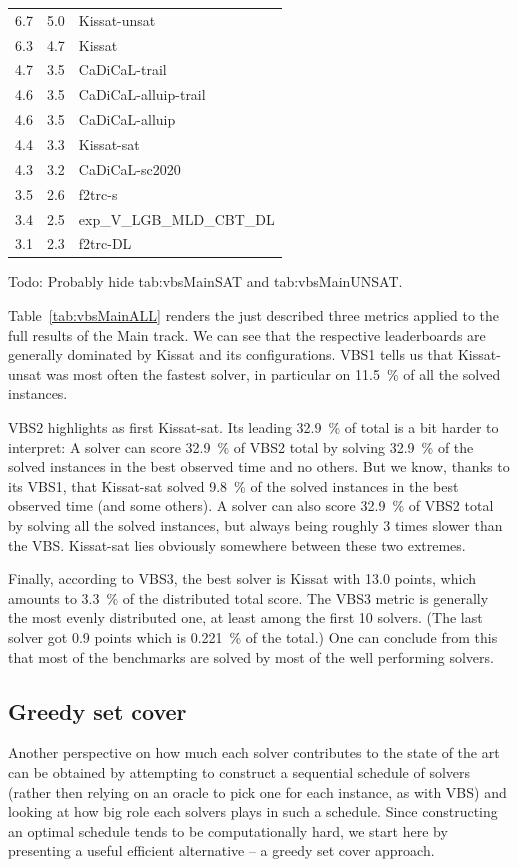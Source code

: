 \documentclass{elsarticle}
\newcommand{\todo}[1]{{\color{purple}Todo: #1}}
\begin{document}
\begin{table}
\begin{center}
\begin{tabular}{ccl}
\hline
6.7 & 5.0 & Kissat-unsat \\
6.3 & 4.7 & Kissat \\
4.7 & 3.5 & CaDiCaL-trail \\
4.6 & 3.5 & CaDiCaL-alluip-trail \\
4.6 & 3.5 & CaDiCaL-alluip \\
4.4 & 3.3 & Kissat-sat \\
4.3 & 3.2 & CaDiCaL-sc2020 \\
3.5 & 2.6 & f2trc-s \\
3.4 & 2.5 & exp\_V\_LGB\_MLD\_CBT\_DL \\
3.1 & 2.3 & f2trc-DL \\
\end{tabular}
\end{center}
\end{table}

\todo{Probably hide tab:vbsMainSAT and tab:vbsMainUNSAT.} 

Table~\ref{tab:vbsMainALL} renders the just described three metrics applied 
to the full results of the Main track. We can see that the respective leaderboards 
are generally dominated by Kissat and its configurations.
VBS1 tells us that Kissat-unsat was most often the fastest solver,
in particular on \SI{11.5}{\percent} of all the solved instances.

VBS2 highlights as first Kissat-sat. Its leading \SI{32.9}{\percent} of total is a bit harder to 
interpret: A solver can score \SI{32.9}{\percent} of VBS2 total
by solving \SI{32.9}{\percent} of the solved instances in the best observed time
and no others. But we know, thanks to its VBS1, that Kissat-sat solved \SI{9.8}{\percent}
of the solved instances in the best observed time (and some others).
A solver can also score \SI{32.9}{\percent} of VBS2 total by solving all the solved instances,
but always being roughly 3 times slower than the VBS. 
Kissat-sat lies obviously somewhere between these two extremes.

Finally, according to VBS3, the best solver is Kissat with 13.0 points,
which amounts to \SI{3.3}{\percent} of the distributed total score.
The VBS3 metric is generally the most evenly distributed one,
at least among the first 10 solvers. 
(The last solver got 0.9 points which is \SI{0.221}{\percent} of the total.)
One can conclude from this that most of the benchmarks are solved
by most of the well performing solvers. 

\subsection{Greedy set cover}
Another perspective on how much each solver contributes to the state of the art
can be obtained by attempting to construct a sequential schedule of solvers 
(rather then relying on an oracle to pick one for each instance, as with VBS)
and looking at how big role each solvers plays in such a schedule. Since constructing 
an optimal schedule tends to be computationally hard, we start here by 
presenting a useful efficient alternative -- a greedy set cover approach.
\end{document}
